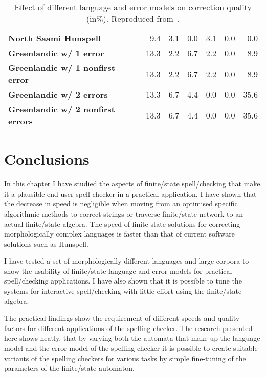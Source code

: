 \documentclass[officiallayout]{unihelcompling}
\begin{document}
\begin{table}
\begin{tabular}{|l|r|r|r|r|r|r|}
        \hline
        \bf North Saami Hunspell & 9.4 & 3.1 & 0.0 & 3.1 & 0.0 & 0.0 \\
          \bf Greenlandic w/ 1 error & 13.3 & 2.2 & 6.7 & 2.2 & 0.0 & 8.9 \\
 \bf Greenlandic w/ 1 nonfirst error & 13.3 & 2.2 & 6.7 & 2.2 & 0.0 & 8.9 \\
         \bf Greenlandic w/ 2 errors & 13.3 & 6.7 & 4.4 & 0.0 & 0.0 & 35.6 \\
\bf Greenlandic w/ 2 nonfirst errors & 13.3 & 6.7 & 4.4 & 0.0 & 0.0 & 35.6 \\
        \hline
    \end{tabular}

    \caption{Effect of different language and error models on correction 
        quality (in\%). Reproduced from~.
    \label{table:nejlt-2013-repro}}
\end{table}

\section{Conclusions}

In this chapter I have studied the aspects of finite\-/state spell\-/checking
that make it a plausible end-user spell-checker in a practical application. I
have shown that the decrease in speed is negligible when moving from an
optimised specific algorithmic methods to correct strings or traverse
finite\-/state network to an actual finite\-/state algebra. The
speed of finite-state solutions for correcting morphologically complex
languages is faster than that of current software solutions such as Hunspell.

I have tested a set of morphologically different languages and large corpora to
show the usability of finite\-/state language and error-models for practical
spell\-/checking applications. I have also shown that it is possible to tune
the systems for interactive spell\-/checking with little effort using the
finite\-/state algebra.

The practical findings show the requirement of different speeds and quality
factors for different applications of the spelling checker. The research
presented here shows neatly, that by varying both the automata that make up the
language model and the error model of the spelling checker it is possible to
create suitable variants of the spelling checkers for various tasks by simple
fine-tuning of the parameters of the finite\-/state automaton.
\end{document}
